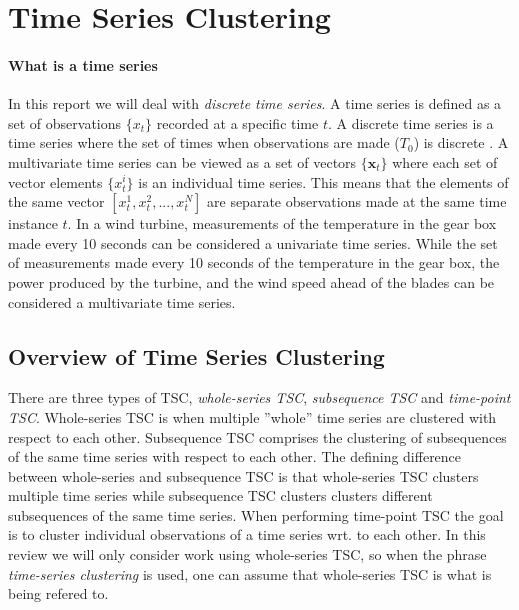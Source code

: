 \chapter{Time Series Clustering}

\subsubsection*{What is a time series}
In this report we will deal with \textit{discrete time series}. 
A time series is defined as a set of observations $\{x_t\}$ recorded at a specific time $t$. 
A discrete time series is a time series where the set of times when observations are made ($T_0$) is discrete \cite{brockwell_davis_advanced}. 
A multivariate time series can be viewed as a set of vectors $\{\mathbf{x}_t\}$ where each set of vector elements $\{x^i_t\}$ is an individual time series. 
This means that the elements of the same vector $[x^1_t, x^2_t,...,x^N_t]$ are separate observations made at the same time instance $t$. 
In a wind turbine, measurements of the temperature in the gear box made every 10 seconds can be considered a univariate time series. 
While the set of measurements made every 10 seconds of the temperature in the gear box, the power produced by the turbine, and the wind speed ahead of the blades can be considered a multivariate time series. \bigskip

\section{Overview of Time Series Clustering}
There are three types of TSC, \textit{whole-series TSC}, \textit{subsequence TSC} and \textit{time-point TSC}. 
Whole-series TSC is when multiple ''whole'' time series are clustered with respect to each other. 
Subsequence TSC comprises the clustering of subsequences of the same time series with respect to each other. 
The defining difference between whole-series and subsequence TSC is that whole-series TSC clusters multiple time series while subsequence TSC clusters clusters different subsequences of the same time series. 
When performing time-point TSC the goal is to cluster individual observations of a time series wrt. to each other. 
In this review we will only consider work using whole-series TSC, so when the phrase \textit{time-series clustering} is used, one can assume that whole-series TSC is what is being refered to. \bigskip

